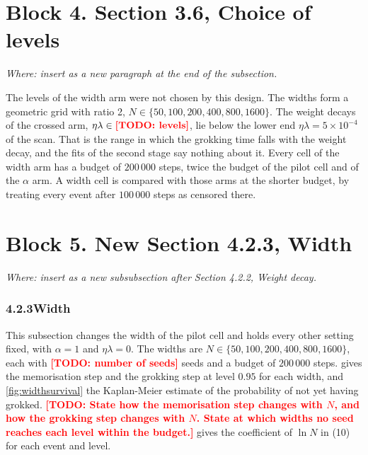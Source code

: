 \documentclass[a4paper,11pt]{article} %
\newcommand{\gref}[2]{#2}
\newcommand{\TODO}[1]{\textcolor{red}{\textbf{[TODO: #1]}}}
\newcommand{\where}[1]{\par\smallskip\noindent\textit{\small Where: #1}\par\smallskip}
\begin{document}
\section*{Block 4. Section 3.6, Choice of levels}
\where{insert as a new paragraph at the end of the subsection.}

The levels of the width arm were not chosen by this design. The widths form a
geometric grid with ratio 2,
$N\in\{50,100,200,400,800,1600\}$. The weight decays of the crossed arm,
$\eta\lambda\in\TODO{levels}$, lie below the lower end
$\eta\lambda=5\times10^{-4}$ of the scan. That is the range in which the
grokking time falls with the weight decay, and the fits of the second stage
say nothing about it. Every cell of the width arm has a budget of
$200\,000$ steps, twice the budget of the pilot cell and of the $\alpha$ arm.
A width cell is compared with those arms at the shorter budget, by treating
every event after $100\,000$ steps as censored there.

\section*{Block 5. New Section 4.2.3, Width}
\where{insert as a new subsubsection after Section 4.2.2, Weight decay.}

\subsubsection*{4.2.3\quad Width}

This subsection changes the width of the pilot cell and holds every other
setting fixed, with $\alpha=1$ and $\eta\lambda=0$. The widths are
$N\in\{50,100,200,400,800,1600\}$, each with \TODO{number of seeds} seeds and a
budget of $200\,000$ steps.  gives the memorisation step and
the grokking step at level $0.95$ for each width, and \cref{fig:widthsurvival}
the Kaplan-Meier estimate of the probability of not yet having grokked.
\TODO{State how the memorisation step changes with $N$, and how the grokking
step changes with $N$. State at which widths no seed reaches each level within
the budget.}  gives the coefficient of $\ln N$ in
\gref{eq:aft}{(10)} for each event and level.

\end{document}
